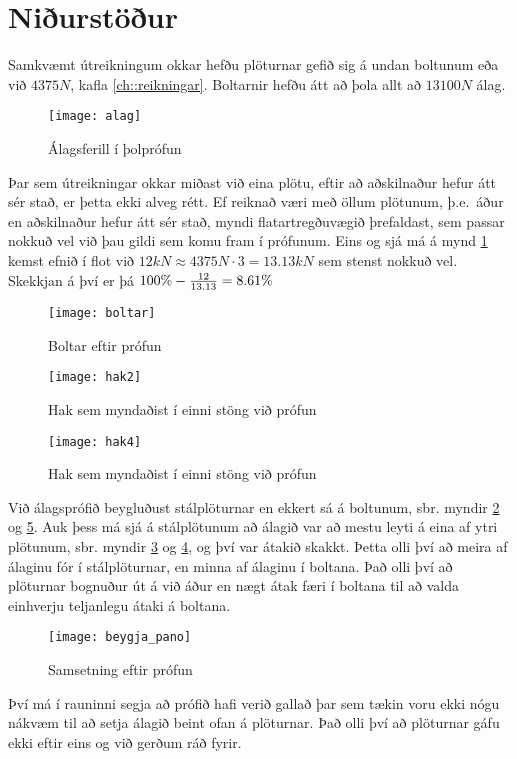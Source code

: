 
\section{Niðurstöður}
\label{sec:nidurstodur}

Samkvæmt útreikningum okkar hefðu plöturnar gefið sig á undan boltunum eða við $4375 N$, \sbr kafla \ref{ch::reikningar}.
Boltarnir hefðu átt að þola allt að $13100 N$ álag.

\begin{figure}[h]
  \centering
  \texttt{[image: alag]}
  \caption{Álagsferill í þolprófun}
  \label{fig:alag}
\end{figure}

Þar sem útreikningar okkar miðast við eina plötu, \te eftir að aðskilnaður hefur átt sér stað, er þetta ekki alveg rétt.
Ef reiknað væri með öllum plötunum, þ.e.~áður en aðskilnaður hefur átt sér stað, myndi flatartregðuvægið þrefaldast, sem passar nokkuð vel við þau gildi sem komu fram í prófunum.
Eins og sjá má á mynd \ref{fig:alag} kemst efnið í flot við \(12 kN \approx 4375 N \cdot 3 = 13.13 kN\) sem stenst nokkuð vel.
Skekkjan á því er þá \(100\% - {12 \over 13.13} = 8.61\% \)

\clearpage

\begin{figure}
  \centering
  \texttt{[image: boltar]}
  \caption{Boltar eftir prófun}
  \label{fig:boltar}
\end{figure}


\begin{figure}
  \centering
  \texttt{[image: hak2]}
  \caption{Hak sem myndaðist í einni stöng við prófun}
  \label{fig:hak2}
\end{figure}

\begin{figure}
  \centering
  \texttt{[image: hak4]}
  \caption{Hak sem myndaðist í einni stöng við prófun}
  \label{fig:hak4}
\end{figure}

Við álagsprófið beygluðust stálplöturnar en ekkert sá á boltunum, sbr. myndir \ref{fig:boltar} og \ref{fig:pano}.
Auk þess má sjá á stálplötunum að álagið var að mestu leyti á eina af ytri plötunum, sbr. myndir \ref{fig:hak2} og \ref{fig:hak4}, og því var átakið skakkt. Þetta olli því að meira af álaginu fór í stálplöturnar, en minna af álaginu í boltana.
Það olli því að plöturnar bognuður út á við áður en nægt átak færi í boltana til að valda einhverju teljanlegu átaki á boltana.

\clearpage

\begin{figure}
  \centering
  \texttt{[image: beygja\_pano]}
  \caption{Samsetning eftir prófun}
  \label{fig:pano}
\end{figure}


Því má í rauninni segja að prófið hafi verið gallað þar sem tækin voru ekki nógu nákvæm til að setja álagið beint ofan á plöturnar. Það olli því að plöturnar gáfu ekki eftir eins og við gerðum ráð fyrir.